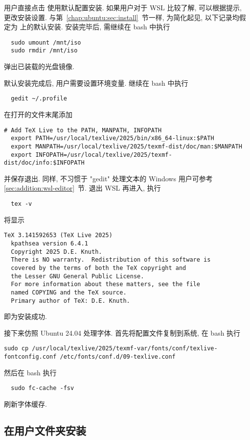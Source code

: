 用户直接点击  使用默认配置安装.
如果用户对于 WSL 比较了解, 可以根据提示, 更改安装设置.
与第~\ref{chap:ubuntu:sec:install}~节一样,
为简化起见,
以下记录均假定为  上的默认安装.
安装完毕后, 需继续在 \textsf{bash} 中执行
\begin{lstlisting}
  sudo umount /mnt/iso
  sudo rmdir /mnt/iso
\end{lstlisting}
弹出已装载的光盘镜像.

默认安装完成后, 用户需要设置环境变量.
继续在 \textsf{bash} 中执行
\begin{lstlisting}
  gedit ~/.profile
\end{lstlisting}
在打开的文件末尾添加
\begin{lstlisting}[deletekeywords = local]
  # Add TeX Live to the PATH, MANPATH, INFOPATH
  export PATH=/usr/local/texlive/2025/bin/x86_64-linux:$PATH
  export MANPATH=/usr/local/texlive/2025/texmf-dist/doc/man:$MANPATH
  export INFOPATH=/usr/local/texlive/2025/texmf-dist/doc/info:$INFOPATH
\end{lstlisting}
并保存退出.
同样,
不习惯于 "gedit" 处理文本的 Windows 用户可参考 \ref{sec:addition:wsl-editor}~节.
退出 WSL 再进入,
执行
\begin{lstlisting}
  tex -v
\end{lstlisting}
将显示
\begin{lstlisting}[language = {}]
  TeX 3.141592653 (TeX Live 2025)
  kpathsea version 6.4.1
  Copyright 2025 D.E. Knuth.
  There is NO warranty.  Redistribution of this software is
  covered by the terms of both the TeX copyright and
  the Lesser GNU General Public License.
  For more information about these matters, see the file
  named COPYING and the TeX source.
  Primary author of TeX: D.E. Knuth.
\end{lstlisting}
即为安装成功.

接下来仿照 Ubuntu 24.04 处理字体.
首先将配置文件复制到系统,
在 \textsf{bash} 执行
\begin{lstlisting}[deletekeywords = local]
  sudo cp /usr/local/texlive/2025/texmf-var/fonts/conf/texlive-fontconfig.conf /etc/fonts/conf.d/09-texlive.conf
\end{lstlisting}
然后在 \textsf{bash} 执行
\begin{lstlisting}
  sudo fc-cache -fsv
\end{lstlisting}
刷新字体缓存.

\subsection{在用户文件夹安装}

